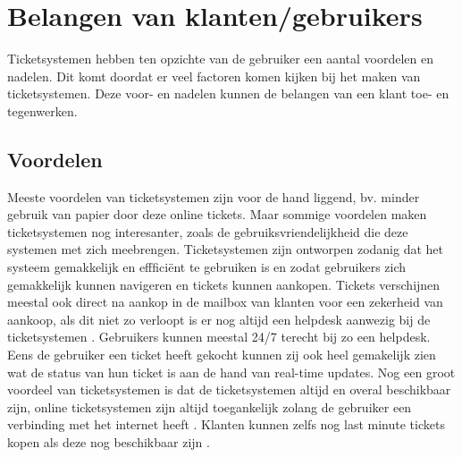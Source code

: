 
\section{Belangen van klanten/gebruikers}
Ticketsystemen hebben ten opzichte van de gebruiker een aantal voordelen en nadelen. Dit komt doordat er veel factoren komen kijken bij het maken van ticketsystemen. 
Deze voor- en nadelen kunnen de belangen van een klant toe- en tegenwerken.

\subsection{Voordelen}
Meeste voordelen van ticketsystemen zijn voor de hand liggend, bv. minder gebruik van papier door deze online tickets.
Maar sommige voordelen maken ticketsystemen nog interesanter, zoals de gebruiksvriendelijkheid die deze systemen met zich meebrengen.
Ticketsystemen zijn ontworpen zodanig dat het systeem gemakkelijk en effficiënt te gebruiken is en zodat gebruikers zich gemakkelijk kunnen navigeren en tickets kunnen aankopen.
Tickets verschijnen meestal ook direct na aankop in de mailbox van klanten voor een zekerheid van aankoop, als dit niet zo verloopt is er nog altijd een helpdesk aanwezig bij de ticketsystemen \cite{cm-voordelen}. 
Gebruikers kunnen meestal 24/7 terecht bij zo een helpdesk. Eens de gebruiker een ticket heeft gekocht kunnen zij ook heel gemakelijk zien wat de status van hun ticket is aan de hand van real-time updates.
Nog een groot voordeel van ticketsystemen is dat de ticketsystemen altijd en overal beschikbaar zijn, online ticketsystemen zijn altijd toegankelijk zolang de gebruiker een verbinding met het internet heeft \cite{Benefitsonline2023}.
Klanten kunnen zelfs nog last minute tickets kopen als deze nog beschikbaar zijn \cite{cm-voordelen}.

